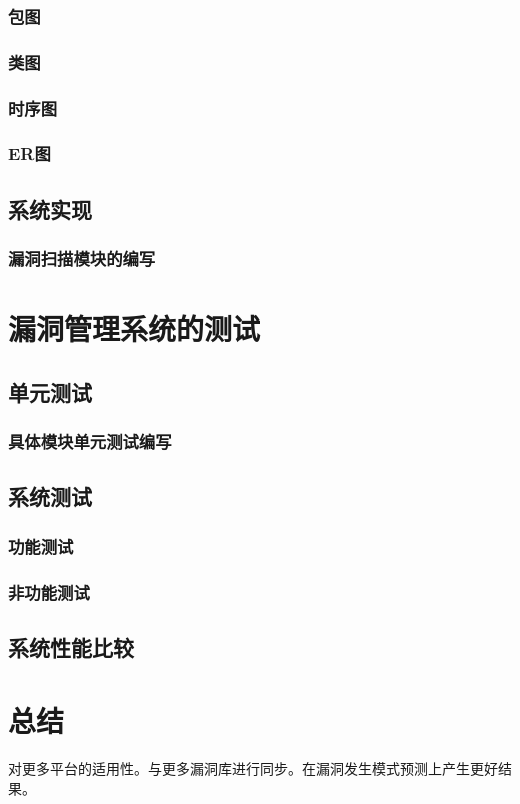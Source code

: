 \documentclass[a4paper]{ctexrep}
\begin{document}
			\subsection{包图}
			\subsection{类图}
			\subsection{时序图}
			\subsection{ER图}
		\section{系统实现}
			\subsection{漏洞扫描模块的编写}
	\chapter{漏洞管理系统的测试}
		\section{单元测试}
			\subsection{具体模块单元测试编写}
		\section{系统测试}
			\subsection{功能测试}
			\subsection{非功能测试}
		\section{系统性能比较}
	\chapter{总结}
	对更多平台的适用性。与更多漏洞库进行同步。在漏洞发生模式预测上产生更好结果。
	
\end{document}
